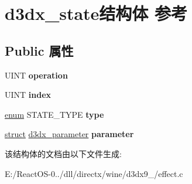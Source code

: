 \hypertarget{structd3dx__state}{}\section{d3dx\+\_\+state结构体 参考}
\label{structd3dx__state}
\subsection*{Public 属性}
\begin{DoxyCompactItemize}
\item 
\mbox{\label{structd3dx__state_a99a5ecb71a57a396d042a47ced51dba6}} 
U\+I\+NT {\bfseries operation}
\item 
\mbox{\label{structd3dx__state_a7986b595e9fea58aea4a7f99f79ef0da}} 
U\+I\+NT {\bfseries index}
\item 
\mbox{\label{structd3dx__state_a29db79f4f3ac58cc5cbc9c22c7374528}} 
\hyperlink{interfaceenum}{enum} S\+T\+A\+T\+E\+\_\+\+T\+Y\+PE {\bfseries type}
\item 
\mbox{\label{structd3dx__state_a65477eed3e80535078ec5658ffac2b86}} 
\hyperlink{interfacestruct}{struct} \hyperlink{structd3dx__parameter}{d3dx\+\_\+parameter} {\bfseries parameter}
\end{DoxyCompactItemize}


该结构体的文档由以下文件生成\+:\begin{DoxyCompactItemize}
\item 
E\+:/\+React\+O\+S-\/0../dll/directx/wine/d3dx9\+\_/effect.\+c\end{DoxyCompactItemize}
